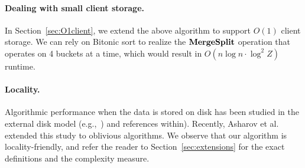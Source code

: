 \paragraph{Dealing with small client storage.}
In Section~\ref{sec:O1client}, we extend the above algorithm
to support $O(1)$ client storage. 
We can rely on 
Bitonic sort to realize the ${\bf MergeSplit}$ operation that operates on 4 buckets at a time,
which would result in $O(n\log n\cdot \log^2 Z)$
runtime. %

\paragraph{Locality.} Algorithmic performance when the data is stored on disk has been studied in the external disk model (e.g.,~\cite{RuemmlerW94,ArgeFGV97,Vitter01,Vitter06}) and references within). Recently, Asharov et al.~\cite{AsharovCNPRS19} extended this study to oblivious algorithms.  We observe that our algorithm is locality-friendly, and refer the reader to Section~\ref{sec:extensions} for the exact definitions and the complexity measure.



%
%
%
%
%

